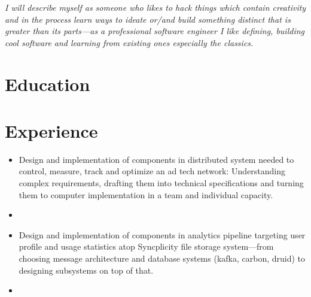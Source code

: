 \documentclass[10pt,a4paper,sans]{moderncvnsinha}        %
\begin{document}
\enumhook
\makecvtitle

\emph{I will describe myself as someone who likes to hack things which contain creativity and in the process learn ways to ideate or/and build something distinct that is greater than its parts---as a professional software engineer I like defining, building cool software and learning from existing ones especially the classics.}

\section{Education}

\section{Experience}
%
\begin{itemize}%
	\item Design and implementation of components in distributed system needed to control, measure, track and optimize an ad tech network: Understanding complex requirements, drafting them into technical specifications and turning them to computer implementation in a team and individual capacity.
		\item {}
\end{itemize}

%
	\begin{itemize}%
		\item Design and implementation of components in analytics pipeline targeting user profile and usage statistics atop Syncplicity file storage system---from choosing message architecture and database systems (kafka, carbon, druid) to designing subsystems on top of that.
		\item {}
	\end{itemize}
\end{document}
